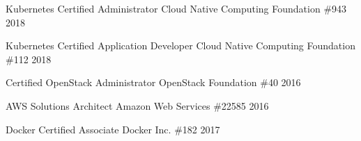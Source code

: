 

\begin{cvhonors}

\cvhonor
    {Kubernetes Certified Administrator}
    {Cloud Native Computing Foundation}
    {\#943}
    {2018} %

  \cvhonor
    {Kubernetes Certified Application Developer}
    {Cloud Native Computing Foundation}
    {\#112}
    {2018} %

  \cvhonor
    {Certified OpenStack Administrator}
    {OpenStack Foundation}
    {\#40}
    {2016} %

  \cvhonor
    {AWS Solutions Architect}
    {Amazon Web Services}
    {\#22585}
    {2016} %

  \cvhonor
    {Docker Certified Associate}
    {Docker Inc.}
    {\#182}
    {2017} %

\end{cvhonors}
